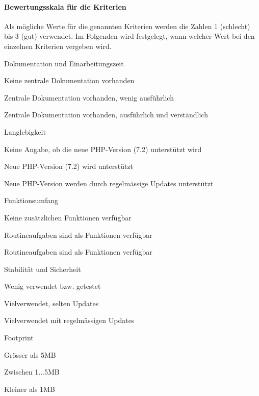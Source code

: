 \paragraph*{Bewertungsskala für die Kriterien}

Als mögliche Werte für die genannten Kriterien werden die Zahlen 1 (schlecht) bis 3 (gut) verwendet. Im Folgenden wird festgelegt, wann welcher Wert bei den einzelnen Kriterien vergeben wird.

\begin{itemize*}
\item Dokumentation und Einarbeitungszeit
  \begin{enumerate*}
  \item Keine zentrale Dokumentation vorhanden
  \item Zentrale Dokumentation vorhanden, wenig ausführlich
  \item Zentrale Dokumentation vorhanden, ausführlich und verständlich
  \end{enumerate*}
\item Langlebigkeit
  \begin{enumerate*}
  \item Keine Angabe, ob die neue PHP-Version (7.2) unterstützt wird
  \item Neue PHP-Version (7.2) wird unterstützt
  \item Neue PHP-Version werden durch regelmässige Updates unterstützt
  \end{enumerate*}
\item Funktionsumfang
  \begin{enumerate*}
  \item Keine zusätzlichen Funktionen verfügbar
  \item Routineaufgaben sind als Funktionen verfügbar
  \item Routineaufgaben sind als Funktionen verfügbar
  \end{enumerate*}
\item Stabilität und Sicherheit
  \begin{enumerate*}
  \item Wenig verwendet bzw. getestet
  \item Vielverwendet, selten Updates
  \item Vielverwendet mit regelmässigen Updates
  \end{enumerate*}
\item Footprint
  \begin{enumerate*}
  \item Grösser als 5MB
  \item Zwischen 1...5MB
  \item Kleiner als 1MB
  \end{enumerate*}
\end{itemize*}


